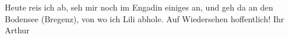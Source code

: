 \begin{ledgroupsized}[t]{13cm}
               Heute reis ich ab, seh mir noch im Engadin einiges
               an, und geh da{\geminationn} an den Bodensee (Bregenz), von wo ich Lili abhole. Auf Wiedersehen hoffentlich! \pend
           \pstart Ihr \spacefill\mbox{Arthur}\pend{}          \endnumbering{}\end{ledgroupsized}  \newcommand{\dateiname}{L02403}\newcommand{\titel}{Arthur Schnitzler an Hugo Hofmannsthal, 3. 9. 1923}\newcommand{\editorInnen}{Martin Anton Müller und Gerd-Hermann Susen}
            \footnotesize
\begin{ledgroupsized}[t]{11.5cm}
\end{ledgroupsized}
         
      